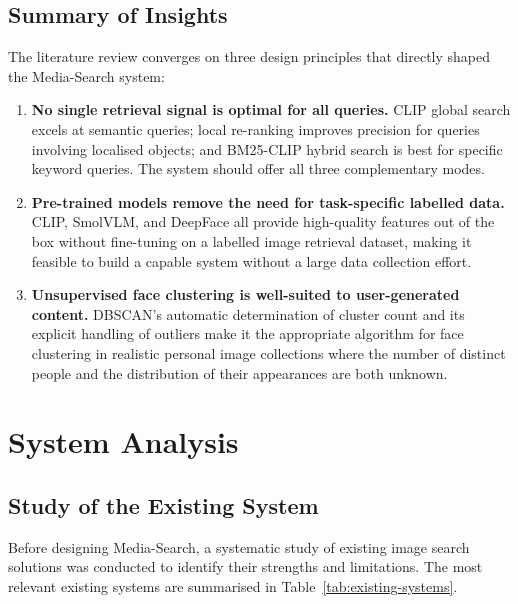 \documentclass[12pt,a4paper,oneside]{report}
\begin{document}
\section{Summary of Insights}
The literature review converges on three design principles that directly shaped
the Media-Search system:
\begin{enumerate}[leftmargin=*]
  \item \textbf{No single retrieval signal is optimal for all queries.}
        CLIP global search excels at semantic queries; local re-ranking
        improves precision for queries involving localised objects; and
        BM25-CLIP hybrid search is best for specific keyword queries.
        The system should offer all three complementary modes.
  \item \textbf{Pre-trained models remove the need for task-specific
        labelled data.}  CLIP, SmolVLM, and DeepFace all provide
        high-quality features out of the box without fine-tuning on a
        labelled image retrieval dataset, making it feasible to build
        a capable system without a large data collection effort.
  \item \textbf{Unsupervised face clustering is well-suited to
        user-generated content.}  DBSCAN's automatic determination of
        cluster count and its explicit handling of outliers make it the
        appropriate algorithm for face clustering in realistic personal
        image collections where the number of distinct people and the
        distribution of their appearances are both unknown.
\end{enumerate}

\chapter{System Analysis}

\section{Study of the Existing System}

Before designing Media-Search, a systematic study of existing image search
solutions was conducted to identify their strengths and limitations. The most
relevant existing systems are summarised in Table~\ref{tab:existing-systems}.
\end{document}
